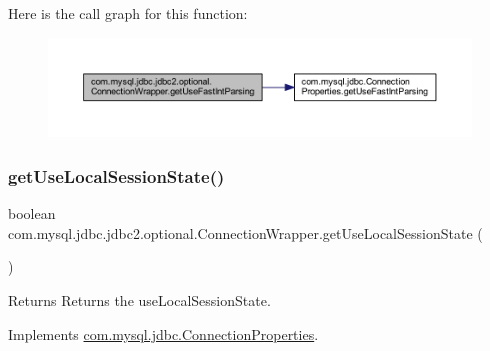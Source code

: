 Here is the call graph for this function\+:
\nopagebreak
\begin{figure}[H]
\begin{center}
\leavevmode
\includegraphics[width=350pt]{classcom_1_1mysql_1_1jdbc_1_1jdbc2_1_1optional_1_1_connection_wrapper_a4f29d0eb16ff4042f8c91983bc766bdc_cgraph}
\end{center}
\end{figure}
\mbox{\label{classcom_1_1mysql_1_1jdbc_1_1jdbc2_1_1optional_1_1_connection_wrapper_a89f23fef1e3b4df8c13e316baa05bb6a}} 
\subsubsection{\texorpdfstring{get\+Use\+Local\+Session\+State()}{getUseLocalSessionState()}}
{\footnotesize\ttfamily boolean com.\+mysql.\+jdbc.\+jdbc2.\+optional.\+Connection\+Wrapper.\+get\+Use\+Local\+Session\+State (\begin{DoxyParamCaption}{ }\end{DoxyParamCaption})}

\begin{DoxyReturn}{Returns}
Returns the use\+Local\+Session\+State. 
\end{DoxyReturn}


Implements \mbox{\hyperlink{interfacecom_1_1mysql_1_1jdbc_1_1_connection_properties_a415c18a036cfda4e12ac4c6952a303b1}{com.\+mysql.\+jdbc.\+Connection\+Properties}}.

